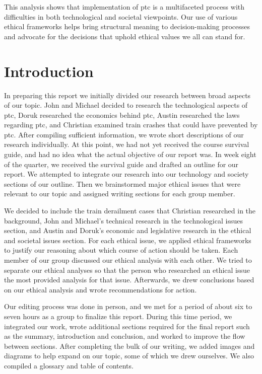 \documentclass[11pt, titlepage]{article}
\begin{document}
This analysis shows that implementation of \gls{ptc} is a multifaceted process
with difficulties in both technological and societal viewpoints. Our use of
various ethical frameworks helps bring structural meaning to decision-making
processes and advocate for the decisions that uphold ethical values we all can
stand for.

\pagebreak

\section{Introduction}

In preparing this report we initially divided our research between broad aspects
of our topic. John and Michael decided to research the technological aspects of
\gls{ptc}, Doruk researched the economics behind \gls{ptc}, Austin researched the
laws regarding \gls{ptc}, and Christian examined train crashes that could have
prevented by \gls{ptc}. After compiling sufficient information, we wrote short
descriptions of our research individually. At this point, we had not yet received
the course survival guide, and had no idea what the actual objective of our
report was. In week eight of the quarter, we received the survival guide and
drafted an outline for our report. We attempted to integrate our research into
our technology and society sections of our outline. Then we brainstormed major
ethical issues that were relevant to our topic and assigned writing sections for
each group member.

We decided to include the train derailment cases that Christian researched in the
background, John and Michael’s technical research in the technological issues
section, and Austin and Doruk’s economic and legislative research in the ethical
and societal issues section. For each ethical issue, we applied ethical
frameworks to justify our reasoning about which course of action should be taken.
Each member of our group discussed our ethical analysis with each other. We tried
to separate our ethical analyses so that the person who researched an ethical
issue the most provided analysis for that issue. Afterwards, we drew conclusions
based on our ethical analysis and wrote recommendations for action.

Our editing process was done in person, and we met for a period of about six to
seven hours as a group to finalize this report. During this time period, we integrated
our work, wrote additional sections required for the final report such as the summary,
introduction and conclusion, and worked to improve the flow between sections. After
completing the bulk of our writing, we added images and diagrams to
help expand on our topic, some of which we drew ourselves. We also compiled a glossary
and table of contents.
\end{document}
